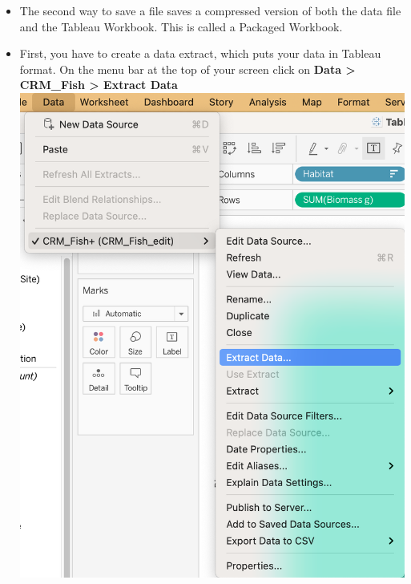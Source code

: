 \documentclass[
]{book}
\providecommand{\tightlist}{%
  \setlength{\itemsep}{0pt}\setlength{\parskip}{0pt}}
\begin{document}
\begin{enumerate}
  \begin{itemize}
  \tightlist
  \item
    The second way to save a file saves a compressed version of both the data file and the Tableau Workbook. This is called a Packaged Workbook.
  \item
    First, you have to create a data extract, which puts your data in Tableau format. On the menu bar at the top of your screen click on \textbf{Data \textgreater{} CRM\_Fish \textgreater{} Extract Data}
    \includegraphics{images/M3S2_extract-data.png}

\end{itemize}
\end{enumerate}
\end{document}
